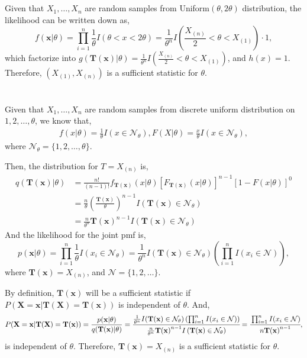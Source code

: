 \documentclass[letterpaper]{article}
\newcommand{\bx}{\mathbf{x}}
\newcommand{\bX}{\mathbf{X}}
\newcommand{\Tx}{\mathbf{T(x)}}
\newcommand{\TX}{\mathbf{T(X)}}
\begin{document}
    \section{}
        Given that $X_1, \dots, X_n$ are random samples from Uniform$(\theta, 2\theta)$ distribution, the likelihood can be written down as,
        \[
        f(\bx|\theta) = \prod_{i=1}^n \frac{1}{\theta} I(\theta < x < 2\theta) = \frac{1}{\theta^n} I(\frac{X_{(n)}}{2} < \theta < X_{(1)}) \cdot 1,
        \]
        which factorize into $g(\Tx|\theta) = \frac{1}{\theta^n} I(\frac{X_{(n)}}{2} < \theta < X_{(1)})$, and $h(x) = 1$. Therefore, $(X_(1), X_(n))$ is a sufficient statistic for $\theta$.
        \section{}
        Given that $X_1, \dots, X_n$ are random samples from discrete uniform distribution on $1, 2, \dots, \theta$, we know that,
        \begin{eqnarray*}
        f(x|\theta) = \frac{1}{\theta}I(x \in \mathcal{N}_\theta),
        F(X|\theta) = \frac{x}{\theta}I(x \in \mathcal{N}_\theta),
        \end{eqnarray*}
        where $\mathcal{N}_\theta = \{1, 2, \dots, \theta\}$.

        Then, the distribution for $T = X_{(n)}$ is,
        \begin{align*}
        q(\Tx|\theta) & = \frac{n!}{(n-1)!} f_{\Tx}(x|\theta) [F_{\Tx}(x|\theta)]^{n-1} [1-F(x|\theta)]^0 \\
        & = \frac{n}{\theta} \left(\frac{\Tx}{\theta}\right)^{n-1} I\left(\Tx \in \mathcal{N}_\theta\right) \\
        & = \frac{n}{\theta^n} \Tx^{n-1} I\left(\Tx \in \mathcal{N}_\theta\right)
        \end{align*}
        And the likelihood for the joint pmf is,
        \[
        p(\bx|\theta) = \prod_{i=1}^n \frac{1}{\theta} I(x_i \in \mathcal{N}_\theta) = \frac{1}{\theta^n} I(\Tx \in \mathcal{N}_\theta) \left(\prod_{i=1}^n I(x_i \in \mathcal{N})\right),
        \]
        where $\Tx = X_{(n)}$,  and $\mathcal{N} = \{1, 2, \dots\}$.

        By definition, $\Tx$ will be a sufficient statistic if $P(\bX = \bx|\TX = \Tx)$ is independent of $\theta$. And,
        \[
        P(\bX = \bx|\TX = \Tx) = \frac{p(\bx|\theta)}{q(\Tx|\theta)} = \cfrac{\frac{1}{\theta^n} I(\Tx \in \mathcal{N}_\theta) \left(\prod_{i=1}^n I(x_i \in \mathcal{N})\right)}{\frac{n}{\theta^n} \Tx^{n-1} I\left(\Tx \in \mathcal{N}_\theta\right)} = \cfrac{\prod_{i=1}^n I(x_i \in \mathcal{N})}{n \Tx^{n-1}},
        \]
        is independent of $\theta$. Therefore, $\Tx = X_{(n)}$ is a sufficient statistic for $\theta$.
\end{document}
